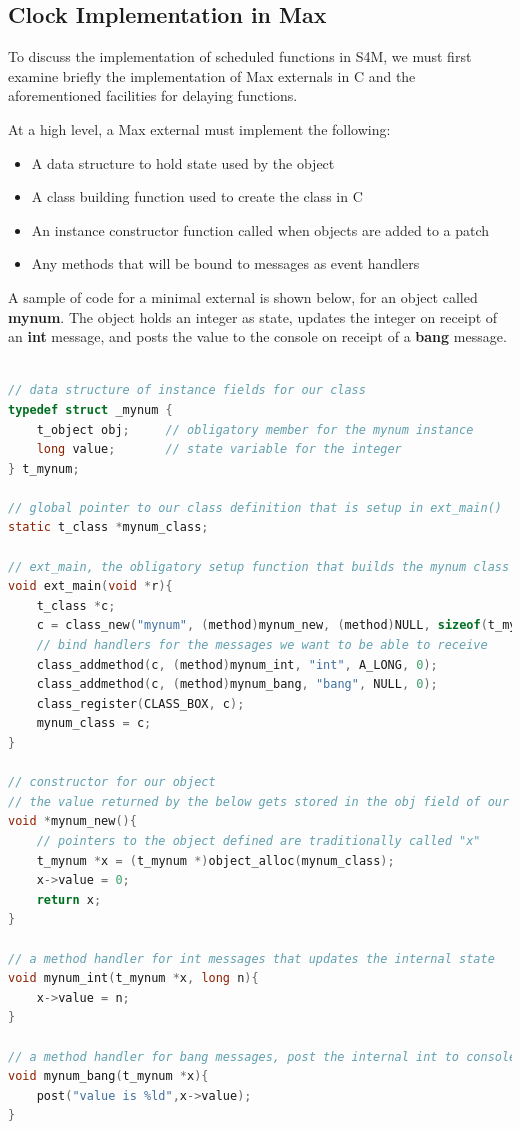 \documentclass[acmsmall]{acmart}
\begin{document}

\subsection{Clock Implementation in Max}

To discuss the implementation of scheduled functions in S4M, we must first examine
briefly the implementation of Max externals in C and the aforementioned 
facilities for delaying functions.

At a high level, a Max external must implement the following:

\begin{itemize}
\item A data structure to hold state used by the object
\item A class building function used to create the class in C
\item An instance constructor function called when objects are added to a patch
\item Any methods that will be bound to messages as event handlers
\end{itemize}

A sample of code for a minimal external is shown below,
for an object called \textbf{mynum}. The object holds an integer as state,
updates the integer on receipt of an \textbf{int} 
message, and posts the value to the console on receipt of a \textbf{bang}
message.

\begin{lstlisting}[language=C]

// data structure of instance fields for our class
typedef struct _mynum {
    t_object obj;     // obligatory member for the mynum instance 
    long value;       // state variable for the integer
} t_mynum;

// global pointer to our class definition that is setup in ext_main()
static t_class *mynum_class; 

// ext_main, the obligatory setup function that builds the mynum class
void ext_main(void *r){
    t_class *c;
    c = class_new("mynum", (method)mynum_new, (method)NULL, sizeof(t_mynum), 0L, 0);
    // bind handlers for the messages we want to be able to receive
    class_addmethod(c, (method)mynum_int, "int", A_LONG, 0);
    class_addmethod(c, (method)mynum_bang, "bang", NULL, 0);
    class_register(CLASS_BOX, c);
    mynum_class = c;
}

// constructor for our object
// the value returned by the below gets stored in the obj field of our t_mynum struct
void *mynum_new(){
    // pointers to the object defined are traditionally called "x"
    t_mynum *x = (t_mynum *)object_alloc(mynum_class);
    x->value = 0;
    return x;
}

// a method handler for int messages that updates the internal state
void mynum_int(t_mynum *x, long n){
    x->value = n;
}

// a method handler for bang messages, post the internal int to console
void mynum_bang(t_mynum *x){
    post("value is %ld",x->value);
}

\end{lstlisting}
\end{document}
